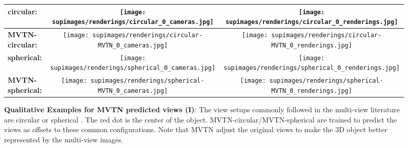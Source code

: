 \documentclass[10pt,twocolumn,letterpaper]{article}
\begin{document}
\begin{figure*} [h]
\begin{tabular}{lc|c}
\textbf{circular:} \hspace{10pt}  & \texttt{[image: supimages/renderings/circular\_0\_cameras.jpg]} &
\texttt{[image: supimages/renderings/circular\_0\_renderings.jpg]} \\ \hline
\textbf{MVTN-circular:}  &\texttt{[image: supimages/renderings/circular-MVTN\_0\_cameras.jpg]} &
\texttt{[image: supimages/renderings/circular-MVTN\_0\_renderings.jpg]} \\ \hline
 \textbf{spherical:} \hspace{10pt} &\texttt{[image: supimages/renderings/spherical\_0\_cameras.jpg]} &
\texttt{[image: supimages/renderings/spherical\_0\_renderings.jpg]} \\ \hline
 \textbf{MVTN-spherical:}  & \texttt{[image: supimages/renderings/spherical-MVTN\_0\_cameras.jpg]} &
\texttt{[image: supimages/renderings/spherical-MVTN\_0\_renderings.jpg]} \\ 
\bottomrule
\end{tabular}
\vspace{4pt}
\caption{\small \textbf{Qualitative Examples for MVTN predicted views (I)}: The view setups commonly followed  in the multi-view literature are circular \cite{mvcnn} or spherical \cite{mvviewgcn,mvrotationnet}. The red dot is the center of the object. MVTN-circular/MVTN-spherical are trained to predict the views as offsets to these common configurations. Note that MVTN adjust the original views to make the 3D object better represented by the multi-view images.
}
    \label{fig:views-mvt-sup-1}
\end{figure*}
\end{document}
